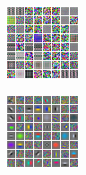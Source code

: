 \documentclass{article} %
\begin{document}
\begin{figure}[ht]
  \centering
  \newcommand{\figspace}{0.0cm}
  \newcommand{\figsize}{0.24\textwidth}
   \begin{subfigure}[b]{\figsize}
        \includegraphics[width=\textwidth]{./Rebbutal_Figures/filters_drlim.png}
        \caption{}
        \label{fig:drlimfilters}
  \end{subfigure}
   \hspace{\figspace} 
  \begin{subfigure}[b]{\figsize}
		\includegraphics[width=\textwidth]{./Figures/filters_not_slow.png}

\end{subfigure}
\end{figure}
\end{document}
